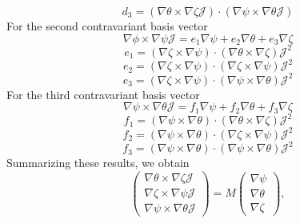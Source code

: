 \documentclass{article}
\begin{document}
\begin{equation}
  d_3 = (\nabla \theta \times \nabla \zeta \mathcal{J}) \cdot (\nabla \psi
  \times \nabla \theta \mathcal{J})
\end{equation}
For the second contravariant basis vector
\begin{equation}
  \nabla \phi \times \nabla \psi \mathcal{J}= e_1 \nabla \psi + e_2 \nabla
  \theta + e_3 \nabla \zeta
\end{equation}
\begin{equation}
  e_1 = (\nabla \zeta \times \nabla \psi) \cdot (\nabla \theta \times \nabla
  \zeta) \mathcal{J}^2
\end{equation}
\begin{equation}
  e_2 = (\nabla \zeta \times \nabla \psi) \cdot (\nabla \zeta \times \nabla
  \psi) \mathcal{J}^2
\end{equation}
\begin{equation}
  e_3 = (\nabla \zeta \times \nabla \psi) \cdot (\nabla \psi \times \nabla
  \theta) \mathcal{J}^2
\end{equation}
For the third contravariant basis vector
\begin{equation}
  \nabla \psi \times \nabla \theta \mathcal{J}= f_1 \nabla \psi + f_2 \nabla
  \theta + f_3 \nabla \zeta
\end{equation}
\begin{equation}
  f_1 = (\nabla \psi \times \nabla \theta) \cdot (\nabla \theta \times \nabla
  \zeta) \mathcal{J}^2
\end{equation}
\begin{equation}
  f_2 = (\nabla \psi \times \nabla \theta) \cdot (\nabla \zeta \times \nabla
  \psi) \mathcal{J}^2
\end{equation}
\begin{equation}
  f_3 = (\nabla \psi \times \nabla \theta) \cdot (\nabla \psi \times \nabla
  \theta) \mathcal{J}^2
\end{equation}
Summarizing these results, we obtain
\begin{equation}
  \label{9-5-e1m} \left(\begin{array}{c}
    \nabla \theta \times \nabla \zeta \mathcal{J}\\
    \nabla \zeta \times \nabla \psi \mathcal{J}\\
    \nabla \psi \times \nabla \theta \mathcal{J}
  \end{array}\right) = M \left(\begin{array}{c}
    \nabla \psi\\
    \nabla \theta\\
    \nabla \zeta
  \end{array}\right),
\end{equation}
\end{document}
